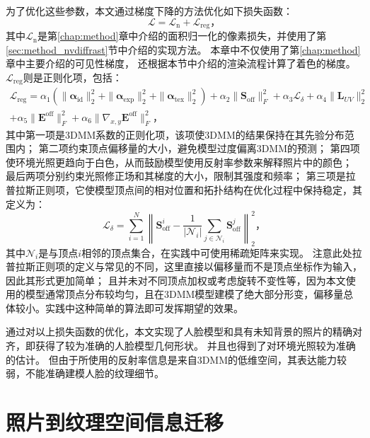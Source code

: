 为了优化这些参数，本文通过梯度下降的方法优化如下损失函数：
\begin{equation}
    \mathcal{L} = \mathcal{L}_\mathrm{n} + \mathcal{L}_\mathrm{reg}
    \text{，}
\end{equation}
其中$\mathcal{L}_\mathrm{n}$是第\ref{chap:method}章中介绍的面积归一化的像素损失，并使用了第\ref{sec:method_nvdiffrast}节中介绍的实现方法。
本章中不仅使用了第\ref{chap:method}章中主要介绍的可见性梯度，
还根据本节中介绍的渲染流程计算了着色的梯度。
$\mathcal{L}_\mathrm{reg}$则是正则化项，包括：
\begin{equation}
\begin{split}
\mathcal{L}_\mathrm{reg} = \alpha_1\left(\| \mathbf{\alpha}_\mathrm{id} \|_2^2 +
    \| \mathbf{\alpha}_\mathrm{exp} \|_2^2 +
    \| \mathbf{\alpha}_\mathrm{tex} \|_2^2\right) +
    \alpha_2 \| \mathbf{S}_\mathrm{off} \|_F^2 +
    \alpha_3 \mathcal{L}_\delta +
    \alpha_4 \| \mathbf{L}_{UV} \|_2^2 \\
    + \alpha_5 \| \mathbf{E}^\mathrm{off} \|_F^2 +
    \alpha_6 \| \nabla_{x,y} \mathbf{E}^\mathrm{off} \|_F^2
    \text{，}
\end{split}
\end{equation}
其中第一项是3DMM系数的正则化项，该项使3DMM的结果保持在其先验分布范围内；
第二项约束顶点偏移量的大小，避免模型过度偏离3DMM的预测；
第四项使环境光照更趋向于白色，从而鼓励模型使用反射率参数来解释照片中的颜色；
最后两项分别约束光照修正场和其梯度的大小，限制其强度和频率；
第三项是拉普拉斯正则项，它使模型顶点间的相对位置和拓扑结构在优化过程中保持稳定，其定义为：
\begin{equation}
    \mathcal{L}_\delta = \sum_{i=1}^N \left\|\mathbf{S}_\mathrm{off}^i - \frac{1}{|\mathcal{N}_i|}\sum_{j\in\mathcal{N}_i} \mathbf{S}_\mathrm{off}^j\right\|_2^2
    \text{，}
\end{equation}
其中$\mathcal{N}_i$是与顶点$i$相邻的顶点集合，在实践中可使用稀疏矩阵来实现。
注意此处拉普拉斯正则项的定义与常见的不同，这里直接以偏移量而不是顶点坐标作为输入，因此其形式更加简单；
且并未对不同顶点加权或考虑旋转不变性等，因为本文使用的模型通常顶点分布较均匀，且在3DMM模型建模了绝大部分形变，偏移量总体较小。实践中这种简单的算法即可发挥期望的效果。

通过对以上损失函数的优化，本文实现了人脸模型和具有未知背景的照片的精确对齐，即获得了较为准确的人脸模型几何形状。
并且也得到了对环境光照较为准确的估计。
但由于所使用的反射率信息是来自3DMM的低维空间，其表达能力较弱，不能准确建模人脸的纹理细节。

\section{照片到纹理空间信息迁移}
\label{sec:method_photo2tex}


